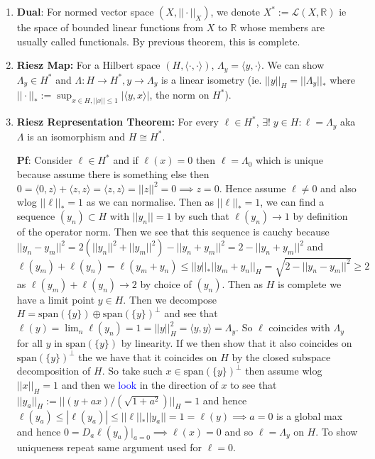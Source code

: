 \documentclass{article}
\begin{document}
\begin{enumerate}
    \item \textbf{Dual}: For normed vector space \((X, ||\cdot||_X)\), we denote \(X^* := \mathcal{L}(X, \mathbb{R})\) ie the space of bounded linear functions from \(X\) to \(\mathbb{R}\) whose members are usually called functionals. By previous theorem, this is complete.

    \item \textbf{Riesz Map:} For a Hilbert space \((H, \langle\cdot, \cdot\rangle) \), \(\Lambda_y = \langle y, \cdot\rangle \). We can show \(\Lambda_y \in H^*\) and \(\Lambda:H \to H^*, y \to \Lambda_y\) is a linear isometry (ie.  \(||y||_H = ||\Lambda_y||_*\) where \(||\cdot||_*:=\sup_{x\in H, ||x||\leq1}|\langle y, x\rangle|\), the norm on \(H^*\)).

    \item \textbf{Riesz Representation Theorem:} For every \(\ell \in H^*\), \(\exists!\; y \in H:\ell = \Lambda_y\) aka \(\Lambda\) is an isomorphism and \(H \cong H^*\).

    \textbf{Pf}: Consider \(\ell \in H^*\) and if \(\ell(x) = 0\) then \(\ell = \Lambda_0\) which is unique because assume there is something else then \(0=\langle 0, z\rangle + \langle z , z\rangle = \langle z, z\rangle = ||z||^2 = 0 \implies z = 0\). Hence assume \(\ell \neq 0\) and also wlog \(||\ell||_* = 1\) as we can normalise. Then as \(||\ell||_* = 1\), we can find a sequence \((y_n) \subset H\) with \(||y_n|| = 1\) by such that \(\ell(y_n) \to 1\) by definition of the operator norm. Then we see that this sequence is cauchy because \(||y_n - y_m||^2 = 2(||y_n||^2 + ||y_m||^2) - ||y_n + y_m||^2= 2- ||y_n+y_m||^2\) and \(\ell(y_m) + \ell(y_n) = \ell (y_m + y_n) \leq ||y||_* ||y_m + y_n||_H = \sqrt{2 - ||y_n - y_m||^2}\geq 2\) as \(\ell(y_m) + \ell(y_n) \to 2\) by choice of \((y_n)\). Then as \(H\) is complete we have a limit point \(y \in H\). Then we decompose \(H = \text{span}(\{y\}) \oplus \text{span}(\{y\})^\perp\) and see that \(\ell(y) = \lim_n \ell(y_n) = 1 = ||y||^2_H = \langle y, y \rangle = \Lambda_y\). So \(\ell\) coincides with \(\Lambda_y\) for all \(y\) in \(\text{span}(\{y\})\) by linearity. If we then show that it also coincides on \(\text{span}(\{y\})^\perp\) the we have that it coincides on \(H\) by the closed subspace decomposition of \(H\). So take such \(x \in \text{span}(\{y\})^\perp\) then assume wlog \(||x||_H = 1\) and then we \textcolor{blue}{look} in the direction of \(x\) to see that \(||y_a||_H := ||(y + a x)/(\sqrt{1 + a^2})||_H = 1\) and hence \(\ell(y_a) \leq |\ell(y_a)| \leq ||\ell||_*||y_a|| = 1 = \ell(y) \implies a = 0\) is a global max and hence \(0 = D_a \ell(y_a)|_{a = 0} \implies \ell(x) = 0 \) and so \(\ell = \Lambda_y\) on \(H\). To show uniqueness repeat same argument used for \(\ell = 0.\)


\end{enumerate}
\end{document}
